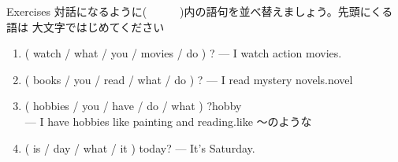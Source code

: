 \documentclass[aspectratio=169,xcolor={dvipsnames,table}]{beamer}
\begin{document}
\begin{frame}[plain]{Exercises}
 対話になるように(~~~~~~)内の語句を並べ替えましょう。先頭にくる語は
大文字ではじめてください
\begin{enumerate}
 \item ( watch / what / you / movies / do ) ? --- I watch action movies.\\
 \item ( books / you / read / what / do ) ? --- I read mystery novels.\hfill{\scriptsize novel }\\
 \item ( hobbies / you / have / do / what ) ?\hfill{}{\scriptsize hobby }\\
\mbox{}\hfill{}--- I have hobbies like painting and reading.\hfill{}{\scriptsize like 〜のような}\\
 \item ( is / day / what / it )  today? --- It's Saturday.\\
\hfill{}
\end{enumerate}
\mbox{}\hfill{\scriptsize {}}

\end{frame}
\end{document}
